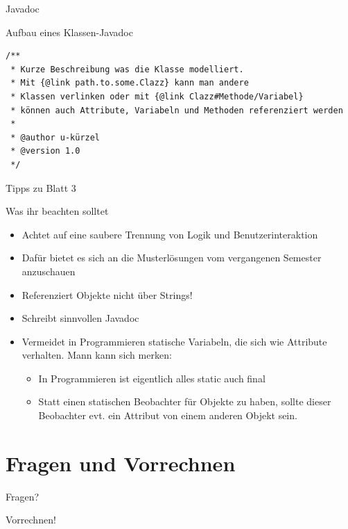 \documentclass[aspectratio=169]{beamer}
\begin{document}
\begin{frame}[fragile]{Javadoc}
  \begin{exampleblock}{Aufbau eines Klassen-Javadoc}
    \begin{lstlisting}
/**
 * Kurze Beschreibung was die Klasse modelliert.
 * Mit {@link path.to.some.Clazz} kann man andere
 * Klassen verlinken oder mit {@link Clazz#Methode/Variabel}
 * können auch Attribute, Variabeln und Methoden referenziert werden
 *
 * @author u-kürzel
 * @version 1.0
 */
    \end{lstlisting}
  \end{exampleblock}
\end{frame}

\begin{frame}{Tipps zu Blatt 3}
  \begin{block}{Was ihr beachten solltet}
    \begin{itemize}
      \pause
      \item Achtet auf eine saubere Trennung von Logik und Benutzerinteraktion
      \pause
      \item Dafür bietet es sich an die Musterlösungen vom vergangenen Semester anzuschauen
      \pause
      \item Referenziert Objekte nicht über Strings!
      \pause
      \item Schreibt sinnvollen Javadoc
      \pause
      \item Vermeidet in Programmieren statische Variabeln, die sich wie Attribute verhalten. \pause \linebreak
        Mann kann sich merken:
        \begin{itemize}
          \pause
          \item In Programmieren ist eigentlich alles \color{keywordcolor}static \color{FGround}auch \color{keywordcolor}final\color{FGround}
          \pause
          \item Statt einen statischen Beobachter für Objekte zu haben, sollte dieser Beobachter evt. ein Attribut von einem anderen Objekt sein.
        \end{itemize}
    \end{itemize}
  \end{block}
\end{frame}



\section{Fragen und Vorrechnen}

\begin{frame}
  \begin{center}\LARGE Fragen?\end{center}
\end{frame}

\begin{frame}
  \begin{center}\LARGE Vorrechnen!\end{center}
\end{frame}
\end{document}
